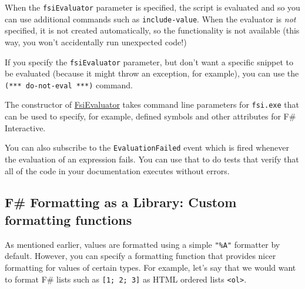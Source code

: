 \documentclass{article}
\begin{document}
When the \texttt{fsiEvaluator} parameter is specified, the script is evaluated and so you
can use additional commands such as \texttt{include-value}. When the evaluator is \emph{not} specified,
it is not created automatically, so the functionality is not available (this way,
you won't accidentally run unexpected code!)


If you specify the \texttt{fsiEvaluator} parameter, but don't want a specific snippet to be evaluated
(because it might throw an exception, for example), you can use the \texttt{(*** do-not-eval ***)}
command.


The constructor of \href{./reference/fsharp-formatting-literate-evaluation-fsievaluator.html}{FsiEvaluator} takes command line parameters for \texttt{fsi.exe} that can
be used to specify, for example, defined symbols and other attributes for F\# Interactive.


You can also subscribe to the \texttt{EvaluationFailed} event which is fired whenever the evaluation
of an expression fails. You can use that to do tests that verify that all of the code in your
documentation executes without errors.
\subsection*{F\# Formatting as a Library: Custom formatting functions}



As mentioned earlier, values are formatted using a simple \texttt{"\%A"} formatter by default.
However, you can specify a formatting function that provides nicer formatting for values
of certain types. For example, let's say that we would want to format F\# lists such as
\texttt{[1; 2; 3]} as HTML ordered lists \texttt{<ol>}.
\end{document}
